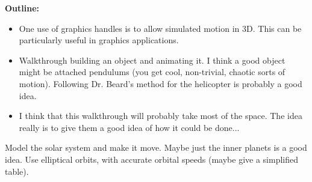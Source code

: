 

{\bf Outline:}

\begin{itemize}
\item One use of graphics handles is to allow simulated motion in 3D. This can be particularly useful in graphics applications.
\item Walkthrough building an object and animating it. I think a good object might be attached pendulums (you get cool, non-trivial, chaotic sorts of motion). Following Dr. Beard's method for the helicopter is probably a good idea.
\item I think that this walkthrough will probably take most of the space. The idea really is to give them a good idea of how it could be done...
\end{itemize}

\begin{problem}
Model the solar system and make it move. Maybe  just the inner planets is a good idea. Use elliptical orbits, with accurate orbital speeds (maybe give a simplified table).
\end{problem}